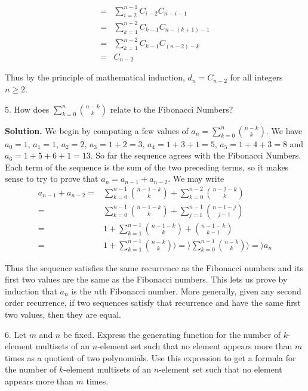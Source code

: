 \documentclass[10pt,]{book}
\theoremstyle{plain}
\theoremstyle{definition}
\theoremstyle{definition}
\numberwithin{equation}{chapter}
\newcommand{\amp}{&}
\begin{document}
\begin{exerciselist}
\begin{align*}
=\amp \sum\limits_{i=2}^{n-1} C_{i-2}C_{n-i-1}\\
=\amp \sum\limits_{k=1}^{n-2} C_{k-1}C_{n-(k+1)-1}\\
=\amp \sum\limits_{k=1}^{n-2} C_{k-1}C_{(n-2)-k}\\
=\amp C_{n-2}
\end{align*}
%
\par
Thus by the principle of mathematical induction, \(d_n=C_{n-2}\) for all integers \(n\ge 2\).%
\item[5.]\hypertarget{exercise-41}{}How does \(\sum_{k=0}^n\binom{n-k}{k}\) relate to the Fibonacci Numbers?%
\par\smallskip
\par\smallskip
\noindent\textbf{Solution.}\hypertarget{solution-362}{}\quad
We begin by computing a few values of \(a_n=\sum_{k=0}^n\binom{n-k}{k}\). We have \(a_0=1\), \(a_1=1\), \(a_2=2\), \(a_3=1+2=3\), \(a_4=1+3+1=5\), \(a_5=1+4+3=8\) and \(a_6=1+5+6+1=13\). So far the sequence agrees with the Fibonacci Numbers. Each term of the sequence is the sum of the two preceding terms, so it makes sense to try to prove that \(a_n=a_{n-1}+a_{n-2}\). We may write%
\begin{align*}
a_{n-1}+a_{n-2}
=\amp \sum_{k=0}^{n-1} \binom{n-1-k}{k}
+\sum_{k=0}^{n-2} \binom{n-2-k}{k}\\
=\amp \sum_{k=0}^{n-1} \binom{n-1-k}{k}+\sum_{j=1}^{n-1}\binom{n-1-j}{j-1}\\
=\amp 1+\sum_{k=1}^{n-1}\binom{n-1-k}{k}+\binom{n-1-k}{k-1}\\
=\amp 1+\sum_{k=1}^{n-1}\binom{n-k}{k} \rangle =\rangle  \sum_{k=0}^{n-1}\binom{n-k}{k}
\rangle =\rangle  a_n
\end{align*}
%
\par
Thus the sequence satisfies the same recurrence as the Fibonacci numbers and its first two values are the same as the Fibonacci numbers. This lets us prove by induction that \(a_n\) is the \(n\)th Fibonacci number. More generally, given any second order recurrence, if two sequences satisfy that recurrence and have the same first two values, then they are equal.%
\item[6.]\hypertarget{exercise-42}{}Let \(m\) and \(n\) be fixed. Express the generating function for the number of \(k\)-element multisets of an \(n\)-element set such that no element appears more than \(m\) times as a quotient of two polynomials. Use this expression to get a formula for the number of \(k\)-element multisets of an \(n\)-element set such that no element appears more than \(m\) times.%

\end{exerciselist}
\end{document}
